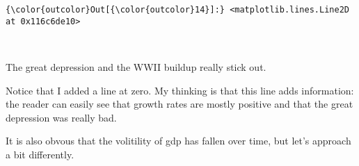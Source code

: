 \documentclass[11pt]{article}
\begin{document}
\begin{Verbatim}[commandchars=\\\{\}]
{\color{outcolor}Out[{\color{outcolor}14}]:} <matplotlib.lines.Line2D at 0x116c6de10>
\end{Verbatim}
            
    \begin{center}
    \end{center}
    { \hspace*{\fill} \\}
    
    The great depression and the WWII buildup really stick out.

Notice that I added a line at zero. My thinking is that this line adds
information: the reader can easily see that growth rates are mostly
positive and that the great depression was really bad.

It is also obvous that the volitility of gdp has fallen over time, but
let's approach a bit differently.
\end{document}
